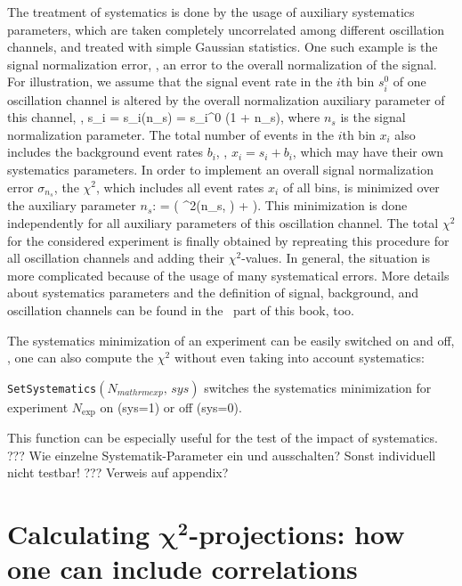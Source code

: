 The treatment of systematics is done by the usage of auxiliary systematics parameters, which are taken completely uncorrelated among different oscillation channels, and treated with simple Gaussian statistics. One such example is the signal normalization error, \ie, an error to the overall normalization of the signal. For illustration, we assume that the signal event rate in the $i$th bin $s_i^0$ of one oscillation channel is altered by the overall normalization auxiliary parameter of this channel, \ie , 
\be
 s_i = s_i(n_s) = s_i^0 \cdot (1 + n_s),
\ee
where $n_s$ is the signal normalization parameter. The total number of events in the $i$th bin $x_i$ also includes the background event rates $b_i$, \ie, $x_i = s_i + b_i$, which may have their own systematics parameters.
In order to implement an overall signal normalization error $\sigma_{n_s}$,  the $\chi^2$, which includes all event rates $x_i$ of all bins, is minimized over the auxiliary parameter $n_s$:
\be
  =  \left(  \chi^2(n_s, \hdots) +  \right).
\ee 
This minimization is done independently for all auxiliary parameters of this oscillation channel. The total $\chi^2$ for the considered experiment is finally obtained by repreating this procedure for all oscillation channels and adding their $\chi^2$-values. In general, the situation is more complicated because of the usage of many systematical errors. More details about systematics parameters and the definition of signal, background, and oscillation channels can be found in the \EDM\ part of this book, too.

The systematics minimization of an experiment can be easily switched on and off, \ie, one can also compute the $\chi^2$ without even taking into account systematics:
\begin{function}
{\tt SetSystematics}$(N_{mathrm{exp}}, \, sys)$ switches the systematics minimization for experiment $N_{\mathrm{exp}}$ on (sys=1) or off (sys=0).
\end{function}
This function can be especially useful for the test of the impact of systematics.
??? Wie einzelne Systematik-Parameter ein und ausschalten? Sonst individuell nicht testbar! ??? Verweis auf appendix? 

\chapter[Calculating $\chi^2$-projections: how one can include correlations]{Calculating $\boldsymbol{\chi^2}$-projections: how one can include correlations}

